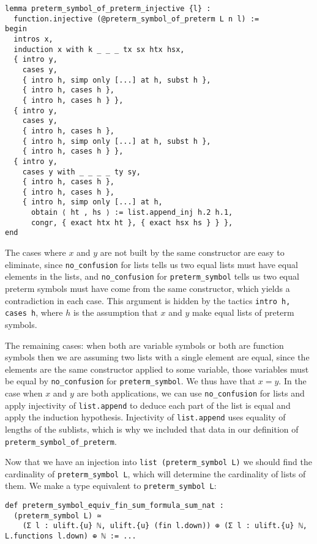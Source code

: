 \documentclass{article}
\newcommand{\<}{\langle}
\renewcommand{\>}{\rangle}
\theoremstyle{definitionstyle}
\theoremstyle{exercisestyle}
\theoremstyle{remarkstyle}
\begin{document}
\begin{lstlisting}
lemma preterm_symbol_of_preterm_injective {l} :
  function.injective (@preterm_symbol_of_preterm L n l) :=
begin
  intros x,
  induction x with k _ _ _ tx sx htx hsx,
  { intro y,
    cases y,
    { intro h, simp only [...] at h, subst h },
    { intro h, cases h },
    { intro h, cases h } },
  { intro y,
    cases y,
    { intro h, cases h },
    { intro h, simp only [...] at h, subst h },
    { intro h, cases h } },
  { intro y,
    cases y with _ _ _ _ ty sy,
    { intro h, cases h },
    { intro h, cases h },
    { intro h, simp only [...] at h,
      obtain ⟨ ht , hs ⟩ := list.append_inj h.2 h.1,
      congr, { exact htx ht }, { exact hsx hs } } },
end \end{lstlisting}

The cases where $x$ and $y$ are not built by the same constructor
are easy to eliminate, since \texttt{no\_confusion}
for lists tells us two equal lists must have equal elements in the lists,
and \texttt{no\_confusion} for \texttt{preterm\_symbol} tells us
two equal preterm symbols must have come from the same constructor,
which yields a contradiction in each case.
This argument is hidden by the tactics \texttt{intro h, cases h},
where $h$ is the assumption that $x$ and $y$
make equal lists of preterm symbols.

The remaining cases: when both are variable symbols or both are function symbols
then we are assuming two lists with a single element are equal,
since the elements are the same constructor applied to some variable,
those variables must be equal by \texttt{no\_confusion} for
\texttt{preterm\_symbol}.
We thus have that $x = y$.
In the case when $x$ and $y$ are both applications,
we can use \texttt{no\_confusion} for lists and
apply injectivity of \texttt{list.append}
to deduce each part of the list is equal and apply the induction hypothesis.
Injectivity of \texttt{list.append} uses equality of lengths of the
sublists, which is why we included that data in our definition of
\texttt{preterm\_symbol\_of\_preterm}.

Now that we have an injection into \texttt{list (preterm\_symbol L)}
we should find the cardinality of \texttt{preterm\_symbol L},
which will determine the cardinality of lists of them.
We make a type equivalent to \texttt{preterm\_symbol L}:

\begin{lstlisting}
def preterm_symbol_equiv_fin_sum_formula_sum_nat :
  (preterm_symbol L) ≃
    (Σ l : ulift.{u} ℕ, ulift.{u} (fin l.down)) ⊕ (Σ l : ulift.{u} ℕ, L.functions l.down) ⊕ ℕ := ... \end{lstlisting}
\end{document}
